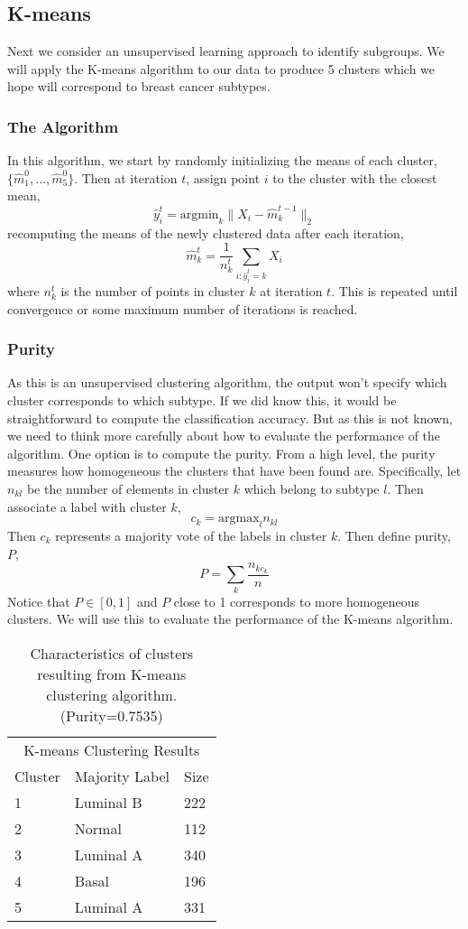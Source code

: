 \documentclass{article}
\begin{document}
\subsection{K-means}
Next we consider an unsupervised learning approach to identify subgroups. We will apply the K-means algorithm to our data to produce 5 clusters which we hope will correspond to breast cancer subtypes. 
\subsubsection{The Algorithm}
In this algorithm, we start by randomly initializing the means of each cluster, $\{\hat{m}^0_1, ..., \hat{m}^0_5\}$. Then at iteration $t$, assign point $i$ to the cluster with the closest mean,
\[ \hat{y}_i^t = \mbox{argmin}_k \|X_i - \hat{m}^{t-1}_k\|_2 \]
recomputing the means of the newly clustered data after each iteration,
\[ \hat{m}^t_k = \frac{1}{n^t_k}\sum\limits_{i: \hat{y}_i^t = k} X_i \]
where $n_k^t$ is the number of points in cluster $k$ at iteration $t$. This is repeated until convergence or some maximum number of iterations is reached.
\subsubsection{Purity}
As this is an unsupervised clustering algorithm, the output won't specify which cluster corresponds to which subtype. If we did know this, it would be straightforward to compute the classification accuracy. But as this is not known, we need to think more carefully about how to evaluate the performance of the algorithm.
\newline\newline One option is to compute the purity. From a high level, the purity measures how homogeneous the clusters that have been found are. Specifically, let $n_{kl}$ be the number of elements in cluster $k$ which belong to subtype $l$. Then associate a label with cluster $k$,
\[ c_k = \mbox{argmax}_l n_{kl} \]
Then $c_k$ represents a majority vote of the labels in cluster $k$. Then define purity, $P$,
\[ P = \sum\limits_{k} \frac{n_{kc_k}}{n} \]
Notice that $P \in [0,1]$ and $P$ close to 1 corresponds to more homogeneous clusters. We will use this to evaluate the performance of the K-means algorithm.

\begin{table}[t]
  \caption{Characteristics of clusters resulting from K-means clustering algorithm. (Purity=0.7535)}
  \label{kmeans}
  \centering
  \begin{tabular}{lll}
    \toprule
    \multicolumn{3}{c}{K-means Clustering Results}                   \\
    \cmidrule{1-3}
    Cluster     & Majority Label     & Size \\
    \midrule
    1 & Luminal B & 222 \\
    2 & Normal & 112 \\
    3 & Luminal A & 340 \\
    4 & Basal & 196 \\
    5 & Luminal A & 331 \\
    \bottomrule
  \end{tabular}
\end{table}
\end{document}
